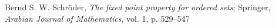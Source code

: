 \documentclass{article}
\begin{document}
  \begin{thebibliography}{1}
     Bernd S. W. Schröder,
      \textit{The fixed point property for ordered sets};
      Springer, \textit{Arabian Journal of Mathematics}, vol. 1, p. 529--547
  \end{thebibliography}
\end{document}
